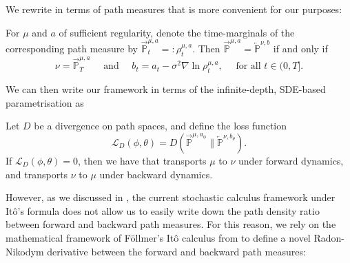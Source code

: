 We rewrite  \parencite{anderson1982reverse,nelson2020dynamical} in terms of path measures that is more convenient for our purposes:
\begin{selfproposition}
    \label{prop:time_reversal_of_sdes}
    For $\mu$ and $a$ of sufficient regularity, denote the time-marginals of the corresponding path measure by $\overrightarrow{\mathbb{P}}_t^{\mu, a} =: \rho_t^{\mu, a}$. Then $\overrightarrow{\mathbb{P}}^{\mu, a} = \overleftarrow{\mathbb{P}}^{\nu, b}$ if and only if
    \[
        \nu = \overrightarrow{\mathbb{P}}_T^{\mu, a} \quad \text { and } \quad b_t=a_t-\sigma^2 \nabla \ln \rho_t^{\mu, a}, \quad \text { for all } t \in(0, T].
    \]
\end{selfproposition}

We can then write our framework in terms of the infinite-depth, SDE-based parametrisation as
\begin{selfframework}{}
    \label{framework:unifying_framework_diffusion}
    Let $D$ be a divergence on path spaces, and define the loss function
    \[
        \mathcal{L}_D(\phi, \theta)=D\left( \overrightarrow{\mathbb{P}}^{\mu, a_{\phi}} \| \overleftarrow{\mathbb{P}}^{\nu, b_{\theta}} \right) \label{eq:loss_cont_kl}.
    \]
    If $\mathcal{L}_D(\phi, \theta)=0$, then we have that  transports $\mu$ to $\nu$ under forward dynamics, and  transports $\nu$ to $\mu$ under backward dynamics.
\end{selfframework}

However, as we discussed in , the current stochastic calculus framework under It{\^o}'s formula does not allow us to easily write down the path density ratio between forward and backward path measures. For this reason, we rely on the mathematical framework of F{\"o}llmer's Itô calculus \parencite{eberle2011introduction, follmer2006calcul} from  to define a novel Radon-Nikodym derivative between the forward and backward path measures:

